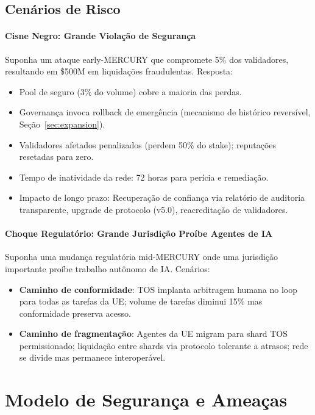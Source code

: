 \documentclass[11pt]{article}
\begin{document}
\begin{itemize}[noitemsep]
\begin{itemize}[noitemsep]
\begin{itemize}[noitemsep]
\subsection{Cenários de Risco}
\paragraph{Cisne Negro: Grande Violação de Segurança}
Suponha um ataque early-MERCURY que compromete 5\% dos validadores, resultando em \$500M em liquidações fraudulentas. Resposta:
\begin{itemize}[noitemsep]
  \item Pool de seguro (3\% do volume) cobre a maioria das perdas.
  \item Governança invoca rollback de emergência (mecanismo de histórico reversível, Seção~\ref{sec:expansion}).
  \item Validadores afetados penalizados (perdem 50\% do stake); reputações resetadas para zero.
  \item Tempo de inatividade da rede: 72 horas para perícia e remediação.
  \item Impacto de longo prazo: Recuperação de confiança via relatório de auditoria transparente, upgrade de protocolo (v5.0), reacreditação de validadores.
\end{itemize}

\paragraph{Choque Regulatório: Grande Jurisdição Proíbe Agentes de IA}
Suponha uma mudança regulatória mid-MERCURY onde uma jurisdição importante proíbe trabalho autônomo de IA. Cenários:
\begin{itemize}[noitemsep]
  \item \textbf{Caminho de conformidade}: TOS implanta arbitragem humana no loop para todas as tarefas da UE; volume de tarefas diminui 15\% mas conformidade preserva acesso.
  \item \textbf{Caminho de fragmentação}: Agentes da UE migram para shard TOS permissionado; liquidação entre shards via protocolo tolerante a atrasos; rede se divide mas permanece interoperável.
\end{itemize}

\section{Modelo de Segurança e Ameaças}
\label{sec:security}


\end{itemize}
\end{itemize}
\end{itemize}
\end{document}
